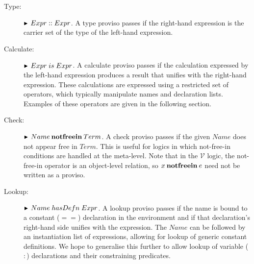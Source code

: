 \documentclass{entcs}
\newcommand{\V}{\mathcal{V}}
\newcommand{\hasDefn}{\mathrel{hasDefn}}
\newcommand{\is}{\mathrel{is}}
\begin{document}
\begin{description}
\item[Type:] $\proviso Expr :: Expr$.
  A type proviso passes if
  the right-hand expression is the carrier set of the type
  of the left-hand expression.

\item[Calculate:] $\proviso Expr \is Expr$.
  A calculate proviso passes if
  the calculation expressed by the left-hand expression
  produces a result that unifies with the right-hand expression.
  These calculations are expressed using a restricted set of operators,
  which typically manipulate names and declaration lists.
  Examples of these operators are given in the following section.

\item[Check:] $\proviso Name \notfreein Term$.
  A check proviso passes if
  the given $Name$ does not appear free in $Term$.
  This is useful for logics
  in which not-free-in conditions are handled at the meta-level.  Note
  that in the $\V$ logic, the not-free-in operator is an object-level
  relation, so $x \mathbin{\mathop{\mathstrut{\mbox{\textbf{notfreein}}}}\nolimits} e$
  need not be written as a proviso.

\item[Lookup:] $\proviso Name \hasDefn Expr$.
  A lookup proviso passes if
  the name is bound to a constant ($==$) declaration in the environment
  and if that declaration's right-hand side unifies with the expression.
  The $Name$ can be followed by an instantiation list of expressions,
  allowing for lookup of generic constant definitions.
  We hope to generalise this further to allow lookup of
  variable ($:$) declarations and their constraining predicates.
\end{description}
\end{document}
